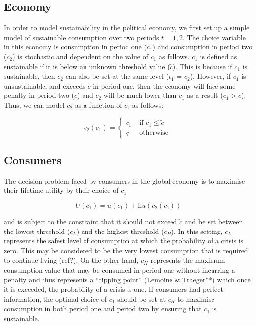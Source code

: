 \documentclass[11pt,preprint, authoryear]{elsarticle}
\numberwithin{equation}{section}
\numberwithin{figure}{section}
\numberwithin{table}{section}
\begin{document}
\hypertarget{economy}{%
\subsection*{Economy}\label{economy}}

In order to model sustainability in the political economy, we first set
up a simple model of sustainable consumption over two periods
\(t = 1, 2\). The choice variable in this economy is consumption in
period one (\(c_1\)) and consumption in period two (\(c_2\)) is
stochastic and dependent on the value of \(c_1\) as follows. \(c_1\) is
defined as sustainable if it is below an unknown threshold value
(\(\tilde{c}\)). This is because if \(c_1\) is sustainable, then \(c_2\)
can also be set at the same level (\(c_1\) = \(c_2\)). However, if
\(c_1\) is unsustainable, and exceeds \(\tilde{c}\) in period one, then
the economy will face some penalty in period two (\(\underline{c}\)) and
\(c_2\) will be much lower than \(c_1\) as a result
(\(c_1> \underline{c}\)). Thus, we can model \(c_2\) as a function of
\(c_1\) as follows:

\[
c_2\left(c_1\right)= \begin{cases}c_1 & \text { if } c_1 \leq \tilde{c} \\ \underline{c} & \text { otherwise }\end{cases}
\]

\hypertarget{consumers}{%
\subsection*{Consumers}\label{consumers}}

The decision problem faced by consumers in the global economy is to
maximise their lifetime utility by their choice of \(c_1\)

\[
U\left(c_1\right)=u\left(c_1\right)+\mathbb{E} u\left(c_2\left(c_1\right)\right)
\]

and is subject to the constraint that it should not exceed \(\tilde{c}\)
and be set between the lowest threshold (\(c_L\)) and the highest
threshold (\(c_H\)). In this setting, \(c_L\) represents the safest
level of consumption at which the probability of a crisis is zero. This
may be considered to be the very lowest consumption that is required to
continue living (ref?). On the other hand, \(c_H\) represents the
maximum consumption value that may be consumed in period one without
incurring a penalty and thus represents a ``tipping point'' (Lemoine \&
Traeger**) which once it is exceeded, the probability of a crisis is
one. If consumers had perfect information, the optimal choice of \(c_1\)
should be set at \(c_H\) to maximise consumption in both period one and
period two by ensuring that \(c_1\) is sustainable.
\end{document}
